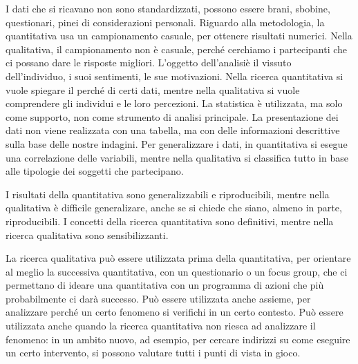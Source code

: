 I dati che si ricavano non sono standardizzati, possono essere brani, sbobine, questionari, pinei di considerazioni personali.
Riguardo alla metodologia, la quantitativa usa un campionamento casuale, per ottenere risultati numerici. Nella qualitativa, il campionamento non è casuale, perché cerchiamo i partecipanti che ci possano dare le risposte migliori.
L'oggetto dell'analisiè il vissuto dell'individuo, i suoi sentimenti, le sue motivazioni.
Nella ricerca quantitativa si vuole spiegare il perché di certi dati, mentre nella qualitativa si vuole comprendere gli individui e le loro percezioni.
La statistica è utilizzata, ma solo come supporto, non come strumento di analisi principale. La presentazione dei dati non viene realizzata con una tabella, ma con delle informazioni descrittive sulla base delle nostre indagini.
Per generalizzare i dati, in quantitativa si esegue una correlazione delle variabili, mentre nella qualitativa si classifica tutto in base alle tipologie dei soggetti che partecipano.

I risultati della quantitativa sono generalizzabili e riproducibili, mentre nella qualitativa è difficile generalizare, anche se si chiede che siano, almeno in parte, riproducibili.
I concetti della ricerca quantitativa sono definitivi, mentre nella ricerca qualitativa sono sensibilizzanti.

La ricerca qualitativa può essere utilizzata prima della quantitativa, per orientare al meglio la successiva quantitativa, con un questionario o un focus group, che ci permettano di ideare una quantitativa con un programma di azioni che più probabilmente ci darà successo.
Può essere utilizzata anche assieme, per analizzare perché un certo fenomeno si verifichi in un certo contesto. Può essere utilizzata anche quando la ricerca quantitativa non riesca ad analizzare il fenomeno: in un ambito nuovo, ad esempio, per cercare indirizzi su come eseguire un certo intervento, si possono valutare tutti i punti di vista in gioco. 


